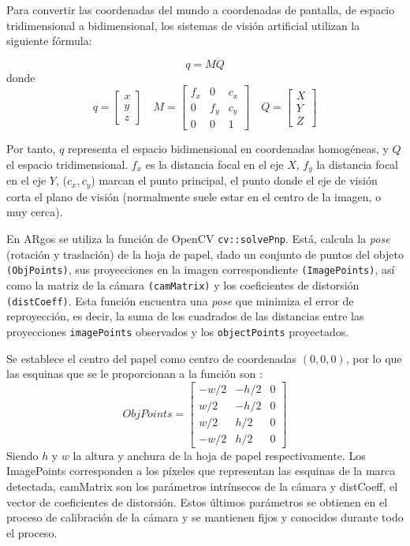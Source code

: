 Para convertir las coordenadas del mundo a coordenadas de pantalla, de espacio tridimensional a bidimensional, los sistemas de visión artificial utilizan la siguiente fórmula:

\begin{equation}
q=MQ
\end{equation}
donde
\begin{equation}
  q=\begin{bmatrix} x \\ y \\ z \end{bmatrix} \quad M=\begin{bmatrix} f_{x} & 0 & c_{x} \\ 0 & f_{y} & c_{y} \\ 0 & 0 & 1 \end{bmatrix} \quad Q=\begin{bmatrix} X \\ Y \\ Z \end{bmatrix}
\end{equation}

Por tanto, $q$ representa el espacio bidimensional en coordenadas homogéneas, y $Q$ el espacio
tridimensional. $f_{x}$ es la distancia focal en el eje $X$, $f_{y}$ la distancia focal en el eje
$Y$, ($c_{x},c_{y}$) marcan el punto principal, el punto donde el eje de visión corta el plano de
visión (normalmente suele estar en el centro de la imagen, o muy cerca).

En ARgos se utiliza la función de OpenCV \texttt{cv::solvePnp}. Está, calcula la \emph{pose} (rotación y
traslación) de la hoja de papel, dado un conjunto de puntos del objeto \texttt{(ObjPoints)}, sus proyecciones en
la imagen correspondiente \texttt{(ImagePoints)}, así como la matriz de la cámara \texttt{(camMatrix)} y los coeficientes
de distorsión \texttt{(distCoeff)}. Esta función encuentra una \emph{pose} que minimiza el error de reproyección, es
decir, la suma de los cuadrados de las distancias entre las proyecciones \texttt{imagePoints} observados y
los \texttt{objectPoints} proyectados.

Se establece el centro del papel como centro de coordenadas $(0,0,0)$, por lo que las esquinas que se le proporcionan a la función son :
\begin{equation}
ObjPoints =\begin{bmatrix} -w/2 & -h/2 & 0 \\
                            w/2 & -h/2 & 0 \\
                            w/2 &  h/2 & 0 \\
                           -w/2 &  h/2 & 0
\end{bmatrix}
\end{equation}
Siendo $h$ y $w$ la altura y anchura de la hoja de papel respectivamente. Los ImagePoints corresponden a los píxeles que
representan las esquinas de la marca detectada, camMatrix son los parámetros intrínsecos de la
cámara y distCoeff, el vector de coeficientes de distorsión. Estos últimos parámetros se obtienen en
el proceso de calibración de la cámara y se mantienen fijos y conocidos durante todo el proceso.

